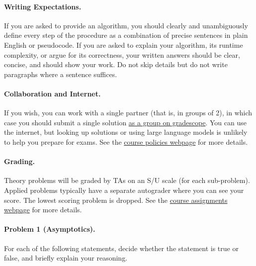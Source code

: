 \documentclass[11pt]{article}
\begin{document}
\paragraph{Writing Expectations.} If you are asked to provide an algorithm, you
should clearly and unambiguously define every step of the procedure as a
combination of precise sentences in plain English or pseudocode. If you are 
asked to explain your algorithm, its runtime complexity, or argue for its
correctness, your written answers should be clear, concise, and should show your
work. Do not skip details but do not write paragraphs where a sentence suffices.

\paragraph{Collaboration and Internet.} If you wish, you can work with a single
partner (that is, in groups of 2), in which case you should submit a single
solution 
\href{https://help.gradescope.com/article/m5qz2xsnjy-student-add-group-members}{as a group on gradescope}. 
You can use the internet, but looking up solutions or using large language 
models is unlikely to help you prepare for exams. 
See the 
\href{https://sites.duke.edu/spring24compsci330/policies/}{course policies webpage} for more details.

\paragraph{Grading.} Theory problems will be graded by TAs on an S/U scale (for
each sub-problem). Applied problems typically have a separate autograder where
you can see your score. The lowest scoring problem is dropped. See the
\href{https://sites.duke.edu/spring24compsci330/assignments/}{course assignments webpage} for more details.



\newpage

\paragraph{Problem 1 (Asymptotics).} 

For each of the following statements, decide whether the statement is true or
false, and briefly explain your reasoning.
\end{document}
